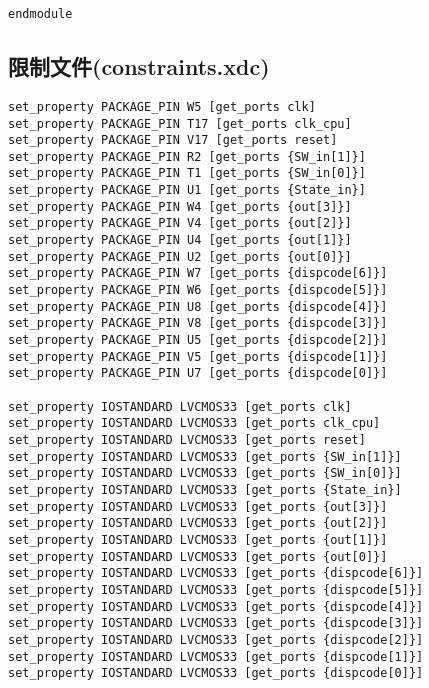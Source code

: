 \begin{multicols}{2}
\begin{lstlisting}
endmodule
\end{lstlisting}

\subsection{限制文件(constraints.xdc)}
\begin{lstlisting}
set_property PACKAGE_PIN W5 [get_ports clk]
set_property PACKAGE_PIN T17 [get_ports clk_cpu]
set_property PACKAGE_PIN V17 [get_ports reset]
set_property PACKAGE_PIN R2 [get_ports {SW_in[1]}]
set_property PACKAGE_PIN T1 [get_ports {SW_in[0]}]
set_property PACKAGE_PIN U1 [get_ports {State_in}]
set_property PACKAGE_PIN W4 [get_ports {out[3]}]
set_property PACKAGE_PIN V4 [get_ports {out[2]}]
set_property PACKAGE_PIN U4 [get_ports {out[1]}]
set_property PACKAGE_PIN U2 [get_ports {out[0]}]
set_property PACKAGE_PIN W7 [get_ports {dispcode[6]}]
set_property PACKAGE_PIN W6 [get_ports {dispcode[5]}]
set_property PACKAGE_PIN U8 [get_ports {dispcode[4]}]
set_property PACKAGE_PIN V8 [get_ports {dispcode[3]}]
set_property PACKAGE_PIN U5 [get_ports {dispcode[2]}]
set_property PACKAGE_PIN V5 [get_ports {dispcode[1]}]
set_property PACKAGE_PIN U7 [get_ports {dispcode[0]}]

set_property IOSTANDARD LVCMOS33 [get_ports clk]
set_property IOSTANDARD LVCMOS33 [get_ports clk_cpu]
set_property IOSTANDARD LVCMOS33 [get_ports reset]
set_property IOSTANDARD LVCMOS33 [get_ports {SW_in[1]}]
set_property IOSTANDARD LVCMOS33 [get_ports {SW_in[0]}]
set_property IOSTANDARD LVCMOS33 [get_ports {State_in}]
set_property IOSTANDARD LVCMOS33 [get_ports {out[3]}]
set_property IOSTANDARD LVCMOS33 [get_ports {out[2]}]
set_property IOSTANDARD LVCMOS33 [get_ports {out[1]}]
set_property IOSTANDARD LVCMOS33 [get_ports {out[0]}]
set_property IOSTANDARD LVCMOS33 [get_ports {dispcode[6]}]
set_property IOSTANDARD LVCMOS33 [get_ports {dispcode[5]}]
set_property IOSTANDARD LVCMOS33 [get_ports {dispcode[4]}]
set_property IOSTANDARD LVCMOS33 [get_ports {dispcode[3]}]
set_property IOSTANDARD LVCMOS33 [get_ports {dispcode[2]}]
set_property IOSTANDARD LVCMOS33 [get_ports {dispcode[1]}]
set_property IOSTANDARD LVCMOS33 [get_ports {dispcode[0]}]
\end{lstlisting}
\end{multicols}